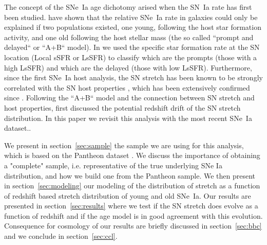 \documentclass[]{aa} %
\begin{document}

The concept of the SNe~Ia age dichotomy arised when the SN~Ia rate has first
been studied. \cite{mannucci2005, scannapieco2005, sullivan2006, aubourg2008}
have shown that the relative SNe~Ia rate in galaxies could only be explained if
two populations existed, one young, following the host star formation activity,
and one old following the host stellar mass (the so called “prompt and delayed“
or “A+B“ model). In \cite{rigault2018} we used the specific star formation rate
at the SN location (Local sSFR or LsSFR) to classify which are the prompts
(those with a high LsSFR) and which are the delayed (those with low LsSFR).
Furthermore, since the first SNe~Ia host analysis, the SN stretch has been known
to be strongly correlated with the SN host properties \citep{hamuy1996,
hamuy2000}, which has been extensively confirmed since \citep[e.g.][]{neill2009,
sullivan2010, lampeitl2010, kelly2010, gupta2011, dandrea2011, childress2013,
rigault2013, pan2014, kim19}. Following the “A+B“ model and the connection between SN
stretch and host properties, \cite{howell2007} first discussed the potential
redshift drift of the SN stretch distribution. In this paper we revisit this
analysis with the most recent SNe~Ia dataset..

We present in section~\ref{sec:sample} the sample we are using for this
analysis, which is based on the Pantheon dataset \citep{scolnic2018a}. We
discuss the importance of obtaining a "complete" sample, i.e. representative of
the true underlying SNe Ia distribution, and how we build one from the Pantheon
sample.  We then present in section~\ref{sec:modeling} our modeling of the
distribution of stretch as a function of redshift based stretch distribution of
young and old SNe~Ia. Our results are presented in section~\ref{sec:results}
where we test if the SN stretch does evolve as a function of redshift and if the
age model is in good agreement with this evolution. Consequence for cosmology of
our results are briefly discussed in section~\ref{sec:bbc} and we conclude in
section~\ref{sec:ccl}.
\end{document}
